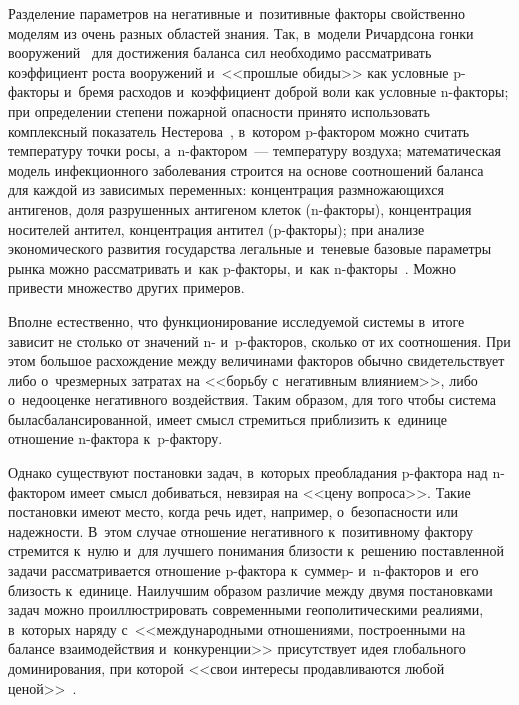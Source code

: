 \begin{multicols}{2}
Разделение параметров на негативные и~позитивные факторы свойственно моделям 
из очень %
  разных областей знания. Так, в~модели Ричардсона гонки 
вооружений~\cite{ShiCh2004} для достижения баланса сил необходимо рассматривать 
коэффициент рос\-та вооружений и~<<прошлые обиды>> как условные p-фак\-то\-ры 
и~бремя расходов и~коэффициент доб\-рой воли как условные n-фак\-то\-ры; 
при определении степени пожарной опас\-ности принято использовать комплексный 
показатель Нестерова~\cite{ShaRaSha2010}, в~котором p-фак\-то\-ром 
можно считать температуру точки росы, а~n-фак\-то\-ром~--- 
температуру воздуха; математическая модель инфекционного заболевания строится 
на основе соотношений баланса~\cite{BoLu2009} для каждой из зависимых переменных: 
концентрация размножающихся антигенов, доля разрушенных антигеном клеток (n-фак\-то\-ры), 
концентрация носителей антител, концентрация антител (p-фак\-то\-ры); 
при анализе экономического развития государства легальные и~теневые базовые 
параметры рынка можно рассматривать и~как p-фак\-то\-ры, 
и~как n-фак\-то\-ры~\cite{Peskova2006}. Можно привести множество других примеров.

Вполне естественно, что функционирование исследуемой сис\-те\-мы в~итоге
 зависит не столько от значений n- и~p-фак\-то\-ров, сколько от их соотношения. 
 При этом большое расхождение между величинами факторов обычно свидетельствует 
 либо о~чрезмерных затратах на <<борьбу с~негативным влиянием>>, либо о~недооценке 
 негативного воздействия. Таким образом, для того чтобы система была\linebreak сбалансированной, 
 имеет смысл стремиться приблизить к~единице отношение n-фак\-то\-ра к~\mbox{p-фак}\-то\-ру. 
 
 Однако существуют постановки задач, в~которых преобладания p-фак\-то\-ра 
 над n-фак\-то\-ром %
 имеет смысл добиваться, невзирая на <<цену вопроса>>. Такие постановки имеют 
 место, когда речь идет, например, о~безопас\-ности или на\-деж\-ности. 
 В~этом случае отношение негативного к~позитивному фактору стремится к~нулю 
 и~для лучшего понимания близости к~решению поставленной задачи рассматривается 
 отношение p-фак\-то\-ра к~сумме\linebreak \mbox{p-} и~n-фак\-то\-ров и~его бли\-зость к~единице.
Наилучшим образом различие между двумя постановками задач можно проиллюстрировать 
современными геополитическими реалиями, в~которых наряду с~<<международными отношениями, 
построенными на балансе взаимодействия и~конкуренции>> присутствует 
идея глобального доминирования, при которой <<свои интересы продавливаются 
любой ценой>>~\cite{Put2017}.


\end{multicols}
